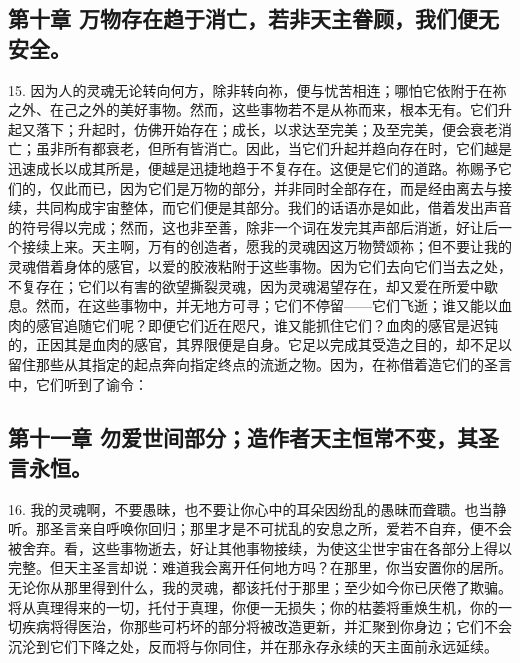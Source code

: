 
\subsection{第十章 万物存在趋于消亡，若非天主眷顾，我们便无安全。}

15. 因为人的灵魂无论转向何方，除非转向祢，便与忧苦相连；哪怕它依附于在祢之外、在己之外的美好事物。然而，这些事物若不是从祢而来，根本无有。它们升起又落下；升起时，仿佛开始存在；成长，以求达至完美；及至完美，便会衰老消亡；虽非所有都衰老，但所有皆消亡。因此，当它们升起并趋向存在时，它们越是迅速成长以成其所是，便越是迅捷地趋于不复存在。这便是它们的道路。祢赐予它们的，仅此而已，因为它们是万物的部分，并非同时全部存在，而是经由离去与接续，共同构成宇宙整体，而它们便是其部分。我们的话语亦是如此，借着发出声音的符号得以完成；然而，这也非至善，除非一个词在发完其声部后消逝，好让后一个接续上来。天主啊，万有的创造者，愿我的灵魂因这万物赞颂祢；但不要让我的灵魂借着身体的感官，以爱的胶液粘附于这些事物。因为它们去向它们当去之处，不复存在；它们以有害的欲望撕裂灵魂，因为灵魂渴望存在，却又爱在所爱中歇息。然而，在这些事物中，并无地方可寻；它们不停留——它们飞逝；谁又能以血肉的感官追随它们呢？即便它们近在咫尺，谁又能抓住它们？血肉的感官是迟钝的，正因其是血肉的感官，其界限便是自身。它足以完成其受造之目的，却不足以留住那些从其指定的起点奔向指定终点的流逝之物。因为，在祢借着造它们的圣言中，它们听到了谕令：\par


\subsection{第十一章 勿爱世间部分；造作者天主恒常不变，其圣言永恒。}

16. 我的灵魂啊，不要愚昧，也不要让你心中的耳朵因纷乱的愚昧而聋聩。也当静听。那圣言亲自呼唤你回归；那里才是不可扰乱的安息之所，爱若不自弃，便不会被舍弃。看，这些事物逝去，好让其他事物接续，为使这尘世宇宙在各部分上得以完整。但天主圣言却说：难道我会离开任何地方吗？在那里，你当安置你的居所。无论你从那里得到什么，我的灵魂，都该托付于那里；至少如今你已厌倦了欺骗。将从真理得来的一切，托付于真理，你便一无损失；你的枯萎将重焕生机，你的一切疾病将得医治，你那些可朽坏的部分将被改造更新，并汇聚到你身边；它们不会沉沦到它们下降之处，反而将与你同住，并在那永存永续的天主面前永远延续。\par

